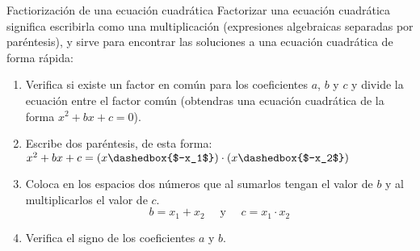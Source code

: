 \begin{infocard}{Factiorización de una ecuación cuadrática}
    Factorizar una ecuación cuadrática significa escribirla como una multiplicación (expresiones algebraicas separadas por paréntesis), y sirve para encontrar las soluciones a una ecuación cuadrática de forma rápida:
    \begin{enumerate}
        \item Verifica si existe un factor en común para los coeficientes $a$, $b$ y $c$ y divide la ecuación entre el factor común (obtendras una ecuación cuadrática de la forma $x^2+bx+c=0$).
        \item Escribe dos paréntesis, de esta forma: $x^2+bx+c = \left(x \dashedbox{$-x_1$}\right)\cdot\left(x \dashedbox{$-x_2$}\right)$
        \item Coloca en los espacios dos números que al sumarlos tengan el valor de $b$ y al multiplicarlos el valor de $c$.
              \[b = x_1 + x_2 \quad\text{ y }\quad c  = x_1 \cdot x_2    \]
        \item Verifica el signo de los coeficientes $a$ y $b$.
    \end{enumerate}
\end{infocard}
